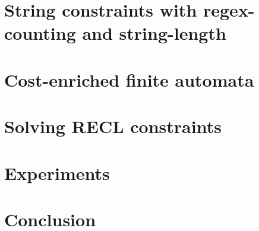 \documentclass[runningheads]{llncs}
\begin{document}
\vspace{-2mm}
\section{String constraints with regex-counting and string-length}\label{sec:recl}
\vspace{-2mm}


\vspace{-2mm}
\section{Cost-enriched finite automata} \label{sec:automaton}
\vspace{-2mm}


\vspace{-2mm}
\section{Solving RECL constraints} \label{sec:algorithm}
\vspace{-2mm}


\vspace{-2mm}
\section{Experiments} \label{sec:implementation}
\vspace{-2mm}


\vspace{-2mm}
\section{Conclusion} \label{sec:conclu}
\vspace{-2mm}


\newpage




%
\end{document}
